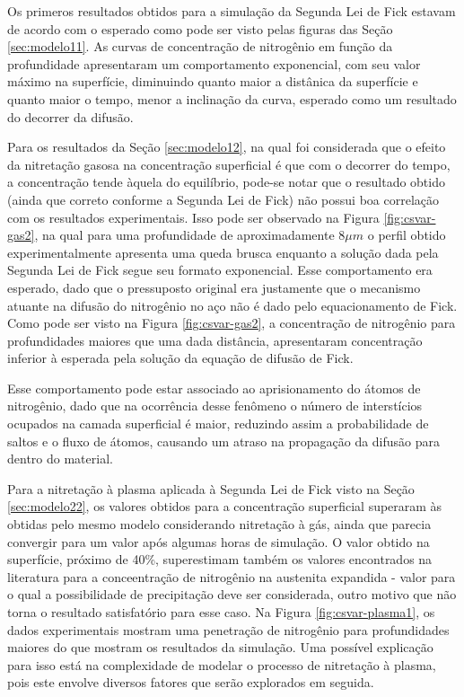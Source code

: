 Os primeros resultados obtidos para a simulação da Segunda Lei de Fick estavam de acordo com o esperado como pode ser visto pelas figuras das Seção \ref{sec:modelo11}. As curvas de concentração de nitrogênio em função da profundidade apresentaram um comportamento exponencial, com seu valor máximo na superfície, diminuindo quanto maior a distânica da superfície e quanto maior o tempo, menor a inclinação da curva, esperado como um resultado do decorrer da difusão.

Para os resultados da Seção \ref{sec:modelo12}, na qual foi considerada que o efeito da nitretação gasosa na concentração superficial é que com o decorrer do tempo, a concentração tende àquela do equilíbrio, pode-se notar que o resultado obtido (ainda que correto conforme a Segunda Lei de Fick) não possui boa correlação com os resultados experimentais. Isso pode ser observado na Figura \ref{fig:csvar-gas2}, na qual para uma profundidade de aproximadamente 8$\mu m$ o perfil obtido experimentalmente apresenta uma queda brusca enquanto a solução dada pela Segunda Lei de Fick segue seu formato exponencial. Esse comportamento era esperado, dado que o pressuposto original era justamente que o mecanismo atuante na difusão do nitrogênio no aço não é dado pelo equacionamento de Fick. Como pode ser visto na Figura \ref{fig:csvar-gas2}, a concentração de nitrogênio para profundidades maiores que uma dada distância, apresentaram concentração inferior à esperada pela solução da equação de difusão de Fick. 

Esse comportamento pode estar associado ao aprisionamento do átomos de nitrogênio, dado que na ocorrência desse fenômeno o número de interstícios ocupados na camada superficial é maior, reduzindo assim a probabilidade de saltos e o fluxo de átomos, causando um atraso na propagação da difusão para dentro do material.

Para a nitretação à plasma aplicada à Segunda Lei de Fick visto na Seção \ref{sec:modelo22}, os valores obtidos para a concentração superficial superaram às obtidas pelo mesmo modelo considerando nitretação à gás, ainda que parecia convergir para um valor após algumas horas de simulação. O valor obtido na superfície, próximo de 40\%, superestimam também os valores encontrados na literatura para a conceentração de nitrogênio na austenita expandida - valor para o qual a possibilidade de precipitação deve ser considerada, outro motivo que não torna o resultado satisfatório para esse caso. Na Figura \ref{fig:csvar-plasma1}, os dados experimentais mostram uma penetração de nitrogênio para profundidades maiores do que mostram os resultados da simulação. Uma possível explicação para isso está na complexidade de modelar o processo de nitretação à plasma, pois este envolve diversos fatores que serão explorados em seguida.


